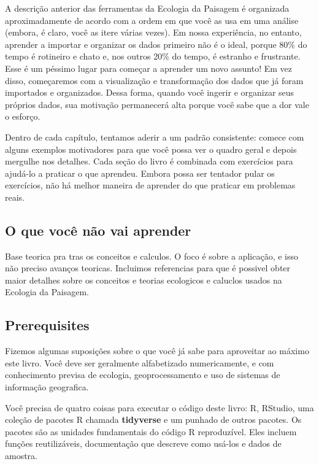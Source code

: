 \documentclass[
]{article}
\begin{document}
A descrição anterior das ferramentas da Ecologia da Paisagem é organizada aproximadamente de acordo com a ordem em que você as usa em uma análise (embora, é claro, você as itere várias vezes).
Em nossa experiência, no entanto, aprender a importar e organizar os dados primeiro não é o ideal, porque 80\% do tempo é rotineiro e chato e, nos outros 20\% do tempo, é estranho e frustrante.
Esse é um péssimo lugar para começar a aprender um novo assunto!
Em vez disso, começaremos com a visualização e transformação dos dados que já foram importados e organizados.
Dessa forma, quando você ingerir e organizar seus próprios dados, sua motivação permanecerá alta porque você sabe que a dor vale o esforço.

Dentro de cada capítulo, tentamos aderir a um padrão consistente: comece com alguns exemplos motivadores para que você possa ver o quadro geral e depois mergulhe nos detalhes.
Cada seção do livro é combinada com exercícios para ajudá-lo a praticar o que aprendeu.
Embora possa ser tentador pular os exercícios, não há melhor maneira de aprender do que praticar em problemas reais.

\hypertarget{o-que-vocuxea-nuxe3o-vai-aprender}{%
\subsection*{O que você não vai aprender}\label{o-que-vocuxea-nuxe3o-vai-aprender}}

Base teorica pra tras os conceitos e calculos. O foco é sobre a aplicação, e isso não preciso avanços teoricas. Incluimos referencias para que é possivel obter maior detalhes sobre os conceitos e teorias ecologicos e caluclos usados na Ecologia da Paisagem.

\hypertarget{prerequisites}{%
\subsection*{Prerequisites}\label{prerequisites}}

Fizemos algumas suposições sobre o que você já sabe para aproveitar ao máximo este livro.
Você deve ser geralmente alfabetizado numericamente, e com conhecimento previsa de ecologia, geoprocessamento e uso de sistemas de informação geografica.

Você precisa de quatro coisas para executar o código deste livro: R, RStudio, uma coleção de pacotes R chamada \textbf{tidyverse} e um punhado de outros pacotes.
Os pacotes são as unidades fundamentais do código R reproduzível.
Eles incluem funções reutilizáveis, documentação que descreve como usá-los e dados de amostra.
\end{document}
